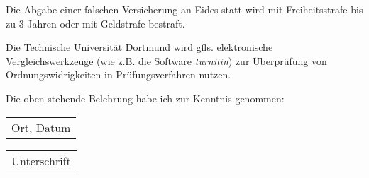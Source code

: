 \noindent Die Abgabe einer falschen Versicherung an Eides statt wird mit Freiheitsstrafe bis zu 3 Jahren oder mit Geldstrafe bestraft.  

\noindent Die Technische Universität Dortmund wird gfls. elektronische Vergleichswerkzeuge (wie z.B. die Software \emph{turnitin}) zur Überprüfung von Ordnungswidrigkeiten in Prüfungsverfahren nutzen. 

\noindent Die oben stehende Belehrung habe ich zur Kenntnis genommen:\\
\begin{tabular}{c}
	\vspace{4em}\hspace*{4cm}\\
	\hline
	Ort, Datum
\end{tabular}
\hfill
\begin{tabular}{c}
	\vspace{4em}\hspace*{4cm}\\
\hline
	Unterschrift
\end{tabular}\\
